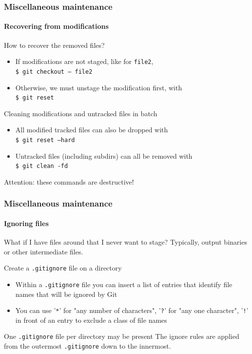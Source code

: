 \begin{frame}
\frametitle{Miscellaneous maintenance}
\framesubtitle{Recovering from modifications}

\begin{block}{How to recover the removed files?}
\begin{itemize}
\item If modifications are not staged, like for \texttt{file2}, \\
\texttt{\$ git checkout --- file2}
\item Otherwise, we must unstage the modification first, with \\
\texttt{\$ git reset}
\end{itemize}
\end{block}

\pause
\begin{block}{Cleaning modifications and untracked files in batch}
\begin{itemize}
\item All modified tracked files can also be dropped with \\
\texttt{\$ git reset ---hard}
\item Untracked files (including subdirs) can all be removed with \\
\texttt{\$ git clean -fd}
\end{itemize}
Attention: these commands are destructive!
\end{block}

\end{frame}

\begin{frame}
\frametitle{Miscellaneous maintenance}
\framesubtitle{Ignoring files}

\begin{block}{What if I have files around that I never want to stage?}
Typically, output binaries or other intermediate files.
\end{block}
\pause
\begin{block}{Create a \texttt{.gitignore} file on a directory}
\begin{itemize}
\item Within a \texttt{.gitignore} file you can insert a list of entries that identify file names that will be ignored by Git
\item You can use '\texttt{*}' for "any number of characters", '\texttt{?}' for "any one character", '\texttt{!}' in front of an entry to exclude a class of file names
\end{itemize}
\end{block}
\pause
\begin{block}{One \texttt{.gitignore} file per directory may be present}
The ignore rules are applied from the outermost \texttt{.gitignore} down to the innermost.
\end{block}

\end{frame}

